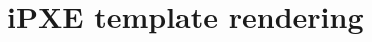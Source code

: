 \documentclass[../main.tex]{subfiles}
\begin{document}
\section{iPXE template rendering}
\end{document}
